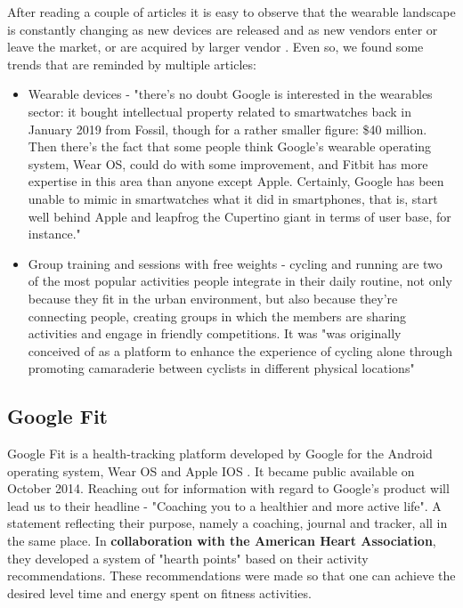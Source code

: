 After reading a couple of articles it is easy to observe that the wearable landscape is constantly changing as new devices are released and as new vendors enter or leave the market, or are acquired by larger vendor \cite{ForbesFitbit}. Even so, we found some trends that are reminded by multiple articles:

\begin{itemize}
    \item {Wearable devices - "there’s no doubt Google is interested in the wearables sector: it bought intellectual property related to smartwatches back in January 2019 from Fossil, though for a rather smaller figure: \$40 million. Then there’s the fact that some people think Google’s wearable operating system, Wear OS, could do with some improvement, and Fitbit has more expertise in this area than anyone except Apple. Certainly, Google has been unable to mimic in smartwatches what it did in smartphones, that is, start well behind Apple and leapfrog the Cupertino giant in terms of user base, for instance." \cite{ForbesFitbit}}
    \item {Group training and sessions with free weights - cycling and running are two of the most popular activities people integrate in their daily routine, not only because they fit in the urban environment, but also because they're connecting people, creating groups in which the members are sharing activities and engage in friendly competitions. It was "was originally conceived of as a platform to enhance the experience of cycling alone through promoting camaraderie between cyclists in different physical locations" \cite{RIVERS2020100345}}
\end{itemize}


\subsection*{Google Fit}

Google Fit is a health-tracking platform developed by Google for the Android operating system, Wear OS and Apple IOS \cite{wikigf}. It became public available on October 2014. Reaching out for information with regard to Google's product will lead us to their headline - "Coaching you to a healthier and more active life". A statement reflecting their purpose, namely a coaching, journal and tracker, all in the same place. In \textbf{collaboration with the American Heart Association}, they developed a system of "hearth points" based on their activity recommendations. These recommendations were made so that one can achieve the desired level time and energy spent on fitness activities. 

